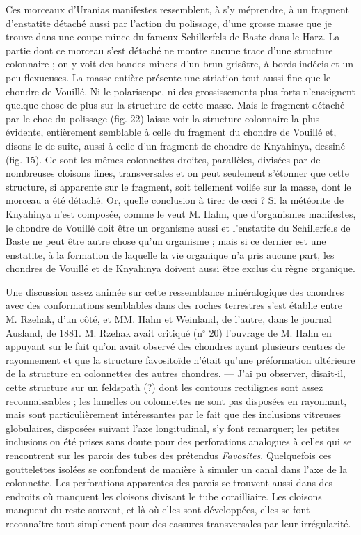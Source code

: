 \documentclass[a4paper, 12pt, oneside, french]{book}
\begin{document}
Ces morceaux d'Uranias manifestes ressemblent, à s'y méprendre, à un fragment d'enstatite détaché aussi par l'action du polissage, d'une grosse masse que je trouve dans une coupe mince du fameux \og Schillerfels \fg de Baste dans le Harz. La partie dont ce morceau s'est détaché ne montre aucune trace d'une structure colonnaire ; on y voit des bandes minces d'un brun grisâtre, à bords indécis et un peu flexueuses. La masse entière présente une striation tout aussi fine que le chondre de Vouillé. Ni le polariscope, ni des grossissements plus forts n'enseignent quelque chose de plus sur la structure de cette masse. Mais le fragment détaché par le choc du polissage (fig. 22) laisse voir la structure colonnaire la plus évidente, entièrement semblable à celle du fragment du chondre de Vouillé et, disons-le de suite, aussi à celle d'un fragment de chondre de Knyahinya, dessiné (fig. 15). Ce sont les mêmes colonnettes droites, parallèles, divisées par de nombreuses cloisons fines, transversales et on peut seulement s'étonner que cette structure, si apparente sur le fragment, soit tellement voilée sur la masse, dont le morceau a été détaché. Or, quelle conclusion à tirer de ceci ? Si la météorite de Knyahinya n'est composée, comme le veut M. Hahn, que d'organismes manifestes, le chondre de Vouillé doit être un organisme aussi et l'enstatite du Schillerfels de Baste ne peut être autre chose qu'un organisme ; mais si ce dernier est une enstatite, à la formation de laquelle la vie organique n'a pris aucune part, les chondres de Vouillé et de Knyahinya doivent aussi être exclus du règne organique.

Une discussion assez animée sur cette ressemblance minéralogique des chondres avec des conformations semblables dans des roches terrestres s'est établie entre M. Rzehak, d'un côté, et MM. Hahn et Weinland, de l'autre, dans le journal Ausland, de 1881. M. Rzehak avait critiqué (n$^{\circ}$ 20) l'ouvrage de M. Hahn en appuyant sur le fait qu'on avait observé des chondres ayant plusieurs centres de rayonnement et que la structure \og favositoïde \fg n'était qu'une préformation ultérieure de la structure en colonnettes des autres chondres. --- \og J'ai pu observer, disait-il, cette structure sur un feldspath (?) dont les contours rectilignes sont assez reconnaissables ; les lamelles ou colonnettes ne sont pas disposées en rayonnant, mais sont particulièrement intéressantes par le fait que des inclusions vitreuses globulaires, disposées suivant l'axe longitudinal, s'y font remarquer; les petites inclusions on été prises sans doute pour des perforations analogues à celles qui se rencontrent sur les parois des tubes des prétendus \emph{Favosites}. Quelquefois ces gouttelettes isolées se confondent de manière à simuler un canal dans l'axe de la colonnette. Les perforations apparentes des parois se trouvent aussi dans des endroits où manquent les cloisons divisant le tube corailliaire. Les cloisons manquent du reste souvent, et là où elles sont développées, elles se font reconnaître tout simplement pour des cassures transversales par leur irrégularité. \fg
\end{document}
